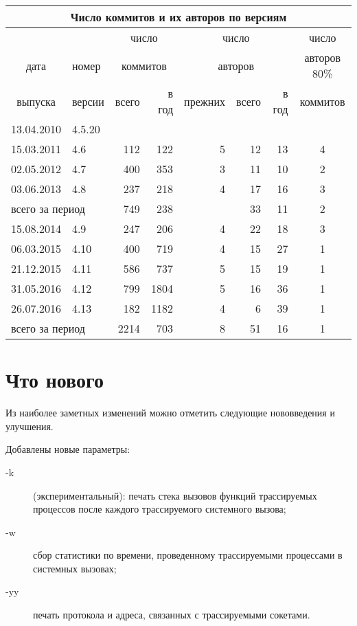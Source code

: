 \documentclass[10pt, a5paper]{article}
\begin{document}
\begin{tabular}{clrrrrrc}
\hline
\multicolumn{8}{c}{Число коммитов и их авторов по версиям} \\ \hline
& & \multicolumn{2}{c}{число} & \multicolumn{3}{c}{число} & число \\
дата & номер & \multicolumn{2}{c}{коммитов} & \multicolumn{3}{c}{авторов} & авторов 80\% \\
выпуска & версии & всего & в год & прежних & всего & в год & коммитов \\ \hline
13.04.2010 & 4.5.20 & & & & & & \\ \hline
15.03.2011 & 4.6 & 112 & 122 & 5 & 12 & 13 & 4 \\ \hline
02.05.2012 & 4.7 & 400 & 353 & 3 & 11 & 10 & 2 \\ \hline
03.06.2013 & 4.8 & 237 & 218 & 4 & 17 & 16 & 3 \\ \hline
\multicolumn{2}{l}{всего за период} & 749 & 238 & & 33 & 11 & 2 \\ \hline
\hline
15.08.2014 & 4.9 & 247 & 206 & 4 & 22 & 18 & 3 \\ \hline
06.03.2015 & 4.10 & 400 & 719 & 4 & 15 & 27 & 1 \\ \hline
21.12.2015 & 4.11 & 586 & 737 & 5 & 15 & 19 & 1 \\ \hline
31.05.2016 & 4.12 & 799 & 1804 & 5 & 16 & 36 & 1 \\ \hline
26.07.2016 & 4.13 & 182 & 1182 & 4 & 6 & 39 & 1 \\ \hline
\multicolumn{2}{l}{всего за период} & 2214 & 703 & 8 & 51 & 16 & 1 \\ \hline
\end{tabular} \bigskip

\section*{Что нового}

Из наиболее заметных изменений можно отметить следующие нововведения и
улучшения.

Добавлены новые параметры:
\begin{description}
\item[-k] (экспериментальный): печать стека вызовов функций трассируемых
процессов после каждого трассируемого системного вызова;
\item[-w] сбор статистики по времени, проведенному трассируемыми процессами
в системных вызовах;
\item[-yy] печать протокола и адреса, связанных с трассируемыми сокетами.
\end{description}
\end{document}
